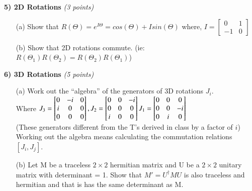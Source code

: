 {\newpage

\textbf{5) 2D Rotations } \hfill \textit{(3 points)}
\begin{itemize}
\item[(a)]Show that $R(\Theta) = e^{I\Theta} = cos(\Theta)+ I sin(\Theta)$
where, $I =  \begin{bmatrix}
    0 & 1  \\
    -1 & 0
  \end{bmatrix} $

\item[(b)]Show that 2D rotations commute.  (ie: $R(\Theta_{1})R(\Theta_{2}) = R(\Theta_{2})R(\Theta_{1})$)
\end{itemize}
}

\vspace*{0.25in}

\textbf{6) 3D Rotations } \hfill \textit{(5 points)}
\begin{itemize}
\item[(a)]Work out the ``algebra'' of the generators of 3D rotations $J_i$. \\
Where $
J_3 =  \begin{bmatrix}    0 & -i & 0  \\ i & 0  & 0 \\ 0 & 0 & 0 \end{bmatrix}, 
\hfill
 J_2 =  \begin{bmatrix}    0 & 0 & -i  \\ 0 & 0  & 0 \\ i & 0 & 0 \end{bmatrix} 
\hfill
 J_1 =  \begin{bmatrix}    0 & 0 & 0  \\ 0 & 0  & -i \\ 0 & i & 0 \end{bmatrix} 
$\\
(These generators different from the T's derived in class by a factor of $i$)\\
Working out the algebra means calculating the commutation relations $[J_i,J_j]$.
\item[(b)]Let M be a traceless $2\times2$ hermitian matrix and U be a $2\times2$  unitary matrix with determinant = 1.  
Show that $M' = U^{\dagger}MU$ is also traceless and hermitian and that is has the same determinant as M.
\end{itemize}




